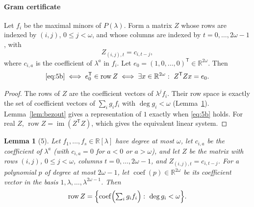 \documentclass[journal]{IEEEtran}
\theoremstyle{plainn}
\newtheorem{lem}{Lemma}
\theoremstyle{remark}
\begin{document}
\paragraph{Gram certificate}\label{sec:gram}
Let $f_i$ be the maximal minors of $P(\lambda)$. Form a matrix $Z$
whose rows are indexed by $(i,j)$, $0\le j<\omega$, and whose
columns are indexed by $t=0,\ldots,2\omega-1$, with
\begin{equation}
Z_{(i,j),t}=c_{i,t-j},
\end{equation}
where $c_{i,a}$ is the coefficient of $\lambda^a$ in $f_i$.
Let $e_0=(1,0,\ldots,0)^{\mathsf T}\in\mathbb R^{2\omega}$. Then
\begin{equation}
	\eqref{eq:5b}
	\iff e_0^{\mathsf T}\in\operatorname{row}Z
	\iff\exists x\in\mathbb R^{2\omega}:\ Z^{\mathsf T}Zx=e_0.
\end{equation}

\begin{proof}
	The rows of $Z$ are the coefficient vectors of $\lambda^j f_i$.
	Their row space is exactly the set of coefficient vectors of
	$\sum_i g_i f_i$ with $\deg g_i<\omega$ (Lemma~\ref{lem:window}).
	Lemma~\ref{lem:bezout} gives a representation of $1$ exactly when
	\eqref{eq:5b} holds. For real $Z$,
	$\operatorname{row}Z=\operatorname{im}(Z^{\mathsf T}Z)$, which gives
	the equivalent linear system.
\end{proof}

\begin{lem}[5]\label{lem:window}
	Let $f_1,\dots,f_s\in\mathbb R[\lambda]$ have degree at most
	$\omega$, let $c_{i,a}$ be the coefficient of $\lambda^a$ (with
	$c_{i,a}=0$ for $a<0$ or $a>\omega$), and let $Z$ be the matrix
	with rows $(i,j)$, $0\le j<\omega$, columns $t=0,\dots,2\omega-1$,
	and $Z_{(i,j),t}=c_{i,t-j}$. For a polynomial $p$ of degree at most
	$2\omega-1$, let $\operatorname{coef}(p)\in\mathbb R^{2\omega}$ be
	its coefficient vector in the basis
	$1,\lambda,\dots,\lambda^{2\omega-1}$. Then
	\begin{equation}
		\operatorname{row}Z=
		\Bigl\{
		\operatorname{coef}\Bigl(\textstyle\sum_i g_if_i\Bigr)
		:\ \deg g_i<\omega
		\Bigr\}.
	\end{equation}
\end{lem}
\end{document}
